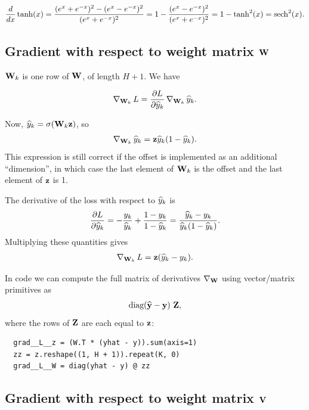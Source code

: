 \begin{mdframed}
{\begin{align*}
  \frac{d}{dx} \tanh(x)
  = \frac{(e^x + e^{-x})^2 - (e^x - e^{-x})^2}{(e^x + e^{-x})^2}
  = 1 - \frac{(e^x - e^{-x})^2}{(e^x + e^{-x})^2}
  = 1 - \tanh^2(x)
  = \operatorname{\text{sech}}^2(x).
\end{align*}
}


\subsection{Gradient with respect to weight matrix $\mathbf{W}$}

$\mathbf{W}_k$ is one row of $\mathbf{W}$, of length $H+ 1$. We have

\begin{align*}
  \operatorname{\nabla}_{\mathbf{W}_k} L = \frac{\partial L}{\partial \widehat{y}_k}\operatorname{\nabla}_{\mathbf{W}_k} \widehat{y}_k.
\end{align*}

Now, $\widehat{y}_k = \sigma(\mathbf{W}_k\mathbf{z})$, so
\begin{align*}
  \operatorname{\nabla}_{\mathbf{W}_k} \widehat{y}_k = \mathbf{z}\widehat{y}_k(1 - \widehat{y}_k).
\end{align*}
This expression is still correct if the offset is implemented as an additional
``dimension'', in which case the last element of $\mathbf{W}_k$ is the offset and the
last element of $\mathbf{z}$ is 1.

The derivative of the loss with respect to $\widehat{y}_k$ is
\begin{align*}
  \frac{\partial L}{\partial \widehat{y}_k} =
  -\frac{y_k}{\widehat{y}_k} + \frac{1 - y_k}{1 - \widehat{y}_k} =
  \frac{\widehat{y}_k - y_k}{\widehat{y}_k(1 - \widehat{y}_k)}.
\end{align*}
Multiplying these quantities gives
\begin{align*}
  \operatorname{\nabla}_{\mathbf{W}_k} L = \mathbf{z}(\widehat{y}_k - y_k).
\end{align*}

In code we can compute the full matrix of derivatives $\operatorname{\nabla}_{\mathbf{W}}$ using
vector/matrix primitives as
\begin{align*}
  \operatorname{\text{diag}}(\mathbf{\widehat{y}} - \mathbf{y}) ~ \mathbf Z,
\end{align*}
where the rows of $\mathbf Z$ are each equal to $\mathbf{z}$:

\begin{verbatim}
  grad__L__z = (W.T * (yhat - y)).sum(axis=1)
  zz = z.reshape((1, H + 1)).repeat(K, 0)
  grad__L__W = diag(yhat - y) @ zz
\end{verbatim}


\subsection{Gradient with respect to weight matrix $\mathbf{V}$}


\end{mdframed}
